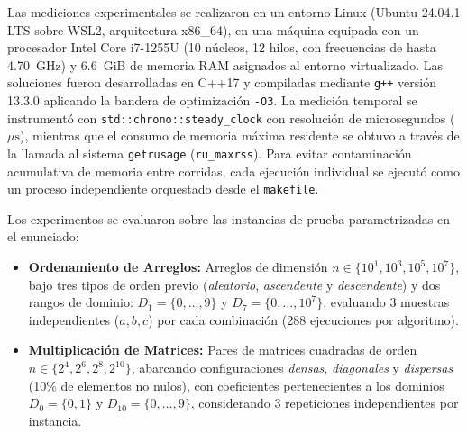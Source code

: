 Las mediciones experimentales se realizaron en un entorno Linux (Ubuntu 24.04.1 LTS sobre WSL2, arquitectura x86\_64), en una máquina equipada con un procesador Intel Core i7-1255U (10 núcleos, 12 hilos, con frecuencias de hasta 4.70~GHz) y 6.6~GiB de memoria RAM asignados al entorno virtualizado. Las soluciones fueron desarrolladas en C++17 y compiladas mediante \texttt{g++} versión 13.3.0 aplicando la bandera de optimización \texttt{-O3}. La medición temporal se instrumentó con \texttt{std::chrono::steady\_clock} con resolución de microsegundos ($\mu\text{s}$), mientras que el consumo de memoria máxima residente se obtuvo a través de la llamada al sistema \texttt{getrusage} (\texttt{ru\_maxrss}). Para evitar contaminación acumulativa de memoria entre corridas, cada ejecución individual se ejecutó como un proceso independiente orquestado desde el \texttt{makefile}.

Los experimentos se evaluaron sobre las instancias de prueba parametrizadas en el enunciado:
\begin{itemize}
    \item \textbf{Ordenamiento de Arreglos:} Arreglos de dimensión $n \in \{10^1, 10^3, 10^5, 10^7\}$, bajo tres tipos de orden previo (\emph{aleatorio}, \emph{ascendente} y \emph{descendente}) y dos rangos de dominio: $D_1 = \{0,\dots,9\}$ y $D_7 = \{0,\dots,10^7\}$, evaluando 3 muestras independientes ($a, b, c$) por cada combinación (288 ejecuciones por algoritmo).
    \item \textbf{Multiplicación de Matrices:} Pares de matrices cuadradas de orden $n \in \{2^4, 2^6, 2^8, 2^{10}\}$, abarcando configuraciones \emph{densas}, \emph{diagonales} y \emph{dispersas} (10\% de elementos no nulos), con coeficientes pertenecientes a los dominios $D_0 = \{0,1\}$ y $D_{10} = \{0,\dots,9\}$, considerando 3 repeticiones independientes por instancia.
\end{itemize}
